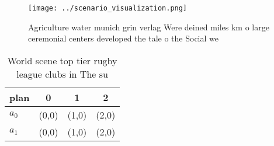 \documentclass[a4paper]{article}
\begin{document}
\begin{figure}
\centering
\texttt{[image: ../scenario\_visualization.png]}
\caption{Agriculture water munich grin verlag Were deined miles km o large ceremonial centers developed the tale o the Social we
}
\end{figure}
 
\begin{table}
\begin{adjustbox}{width=0.6\columnwidth}
\begin{tabular}{|l|l|l|l|}
\hline
\textbf{plan} & \multicolumn{1}{c|}{\textbf{0}} & \multicolumn{1}{c|}{\textbf{1}} & \multicolumn{1}{c|}{\textbf{2}} \\ \hline
\textbf{$a_0$}  & (0,0) & (1,0) & (2,0) \\ \hline
\textbf{$a_1$}  & (0,0) & (1,0) & (2,0) \\ \hline
\end{tabular}
\end{adjustbox}
\caption{World scene top tier rugby league clubs in The su
}
\end{table}
\end{document}
